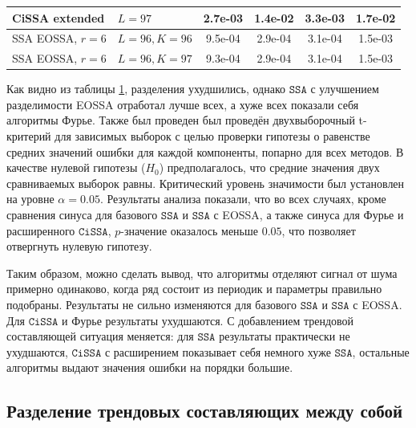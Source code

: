 \documentclass[12pt, specialist, subf
]{disser}
\theoremstyle{definition}
\newcommand{\SSA}{\texttt{SSA}}
\newcommand{\CISSA}{\texttt{CiSSA}}
\begin{document}
\begin{table}[H]
\begin{tabular}{l|l|cccc}
		CiSSA extended     & $L = 97$           &
		2.7e-03            & 1.4e-02            & 3.3e-03                               & 1.7e-02                                                                                         \\
		\hline
		SSA EOSSA, $r = 6$ & $L = 96, K = 96 $  & 9.5e-04                               & 2.9e-04                          & 3.1e-04                          & 1.5e-03                   \\
		SSA EOSSA, $r = 6$ & $L = 96, K = 97 $  &
		9.3e-04            & 2.9e-04            & 3.1e-04                               & 1.5e-03                                                                                         \\
		\hline
	\end{tabular}
	\label{tab:errs_fourier_cissa_trend_noised}
\end{table}


Как видно из таблицы \ref{tab:errs_fourier_cissa_trend_noised}, разделения ухудшились, однако $\SSA$ с улучшением разделимости EOSSA отработал лучше всех, а хуже всех показали себя алгоритмы Фурье. Также был проведен был проведён двухвыборочный t-критерий для зависимых выборок с целью проверки гипотезы о равенстве средних значений ошибки для каждой компоненты, попарно для всех методов. В качестве нулевой гипотезы ($H_0$) предполагалось, что средние значения двух сравниваемых выборок равны. Критический уровень значимости был установлен на уровне $\alpha = 0.05$.
Результаты анализа показали, что во всех случаях, кроме сравнения синуса для базового $\SSA$ и $\SSA$ с EOSSA, а также синуса для Фурье и расширенного $\CISSA$, $p$-значение оказалось меньше $0.05$, что позволяет отвергнуть нулевую гипотезу.

Таким образом, можно сделать вывод, что алгоритмы отделяют сигнал от шума примерно одинаково, когда ряд состоит из периодик и параметры правильно подобраны. Результаты не сильно изменяются для базового $\SSA$ и $\SSA$ с EOSSA. Для $\CISSA$ и Фурье результаты ухудшаются. С добавлением трендовой составляющей ситуация меняется: для $\SSA$ результаты практически не ухудшаются, $\CISSA$ с расширением показывает себя немного хуже $\SSA$, остальные алгоритмы выдают значения ошибки на порядки большие.

\subsection{Разделение трендовых составляющих между собой}
\label{subsubsec:nonperiodic}
\end{document}
